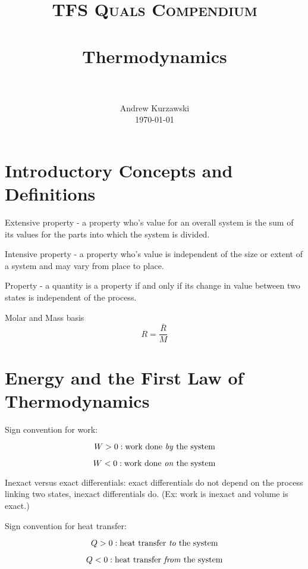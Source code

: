 \documentclass[paper=letter, fontsize=11pt]{scrartcl}
\title{
        \usefont{OT1}{bch}{b}{n}
        \normalfont \normalsize \textsc{TFS Quals Compendium} \\ [25pt]
        \horrule{0.5pt} \\[0.4cm]
        \huge Thermodynamics \\
        \horrule{2pt} \\[0.5cm]
}
\author{
        \normalfont                                 \normalsize
        Andrew Kurzawski\\[-3pt]      \normalsize
        \today
}
\date{}
\numberwithin{equation}{section}        %
\numberwithin{figure}{section}          %
\numberwithin{table}{section}               %
\begin{document}
\maketitle


\section{Introductory Concepts and Definitions}
    
Extensive property - a property who's value for an overall system is the sum of its values for the parts into which the system is divided.

Intensive property - a property who's value is independent of the size or extent of a system and may vary from place to place.

Property - a quantity is a property if and only if its change in value between two states is independent of the process.

Molar and Mass basis
\begin{equation}
    R = \frac{\bar R}{M}
\end{equation}


\newpage
\section{Energy and the First Law of Thermodynamics}

Sign convention for work:

\begin{equation}
W > 0:\text{work done \textit{by} the system}
\end{equation}

\begin{equation}
W < 0:\text{work done \textit{on} the system}
\end{equation}

Inexact versus exact differentials: exact differentials do not depend on the process linking two states, inexact differentials do. (Ex: work is inexact and volume is exact.)

Sign convention for heat transfer:

\begin{equation}
Q > 0:\text{heat transfer \textit{to} the system}
\end{equation}

\begin{equation}
Q < 0:\text{heat transfer \textit{from} the system}
\end{equation}
\end{document}
